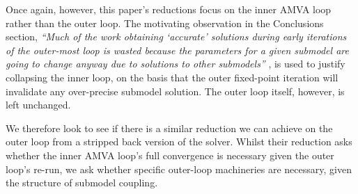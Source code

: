 Once again, however, this paper's reductions focus on the inner AMVA loop rather than the outer loop. The motivating observation in the Conclusions section, \textit{``Much of the work obtaining `accurate' solutions during early iterations of the outer-most loop is wasted because the parameters for a given submodel are going to change anyway due to solutions to other submodels''} \cite{franksli2012}, is used to justify collapsing the inner loop, on the basis that the outer fixed-point iteration will invalidate any over-precise submodel solution. The outer loop itself, however, is left unchanged.

We therefore look to see if there is a similar reduction we can achieve on the outer loop from a stripped back version of the solver. Whilst their reduction asks whether the inner AMVA loop's full convergence is necessary given the outer loop's re-run, we ask whether specific outer-loop machineries are necessary, given the structure of submodel coupling.
